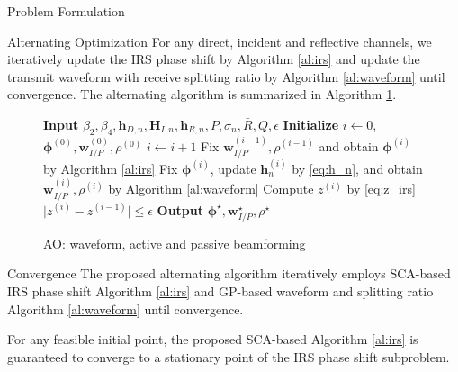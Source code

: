 \documentclass[journal]{IEEEtran}
\begin{document}
\begin{section}{Problem Formulation}
		\begin{subsection}{Alternating Optimization}
			For any direct, incident and reflective channels, we iteratively update the IRS phase shift by Algorithm \ref{al:irs} and update the transmit waveform with receive splitting ratio by Algorithm \ref{al:waveform} until convergence. The alternating algorithm is summarized in Algorithm \ref{al:alternating}.
			\begin{figure}[!t]
				\begin{algorithm}[H]
					\forcealgorithm
					\caption{AO: waveform, active and passive beamforming}
					\label{al:alternating}
					\begin{algorithmic}[1]
						\State \textbf{Input} $\beta_2,\beta_4,\boldsymbol{h}_{D,n},\boldsymbol{H}_{I,n},\boldsymbol{h}_{R,n},P,\sigma_n,\bar{R},Q,\epsilon$
						\State \textbf{Initialize} $i \gets 0$, $\boldsymbol{\phi}^{(0)},\boldsymbol{w}_{I/P}^{(0)},\rho^{(0)}$
						\Repeat
							\State $i \gets i + 1$
							\State Fix $\boldsymbol{w}_{I/P}^{(i-1)},\rho^{(i-1)}$ and obtain $\boldsymbol{\phi}^{(i)}$ by Algorithm \ref{al:irs}
							\State Fix $\boldsymbol{\phi}^{(i)}$, update $\boldsymbol{h}_n^{(i)}$ by \ref{eq:h_n}, and obtain $\boldsymbol{w}_{I/P}^{(i)}, \rho^{(i)}$ by Algorithm \ref{al:waveform}
							\State Compute $z^{(i)}$ by \ref{eq:z_irs}
						\Until $\lvert z^{(i)} - z^{(i-1)} \rvert \le \epsilon$
						\State \textbf{Output} $\boldsymbol{\phi}^{\star}, \boldsymbol{w}_{I/P}^{\star}, \rho^{\star}$
					\end{algorithmic}
				\end{algorithm}
			\end{figure}
		\end{subsection}


		\begin{subsection}{Convergence}
			The proposed alternating algorithm iteratively employs SCA-based IRS phase shift Algorithm \ref{al:irs} and GP-based waveform and splitting ratio Algorithm \ref{al:waveform} until convergence.

			\begin{proposition}\label{pr:irs}
				For any feasible initial point, the proposed SCA-based Algorithm \ref{al:irs} is guaranteed to converge to a stationary point of the IRS phase shift subproblem.
			\end{proposition}


\end{subsection}
\end{section}
\end{document}
